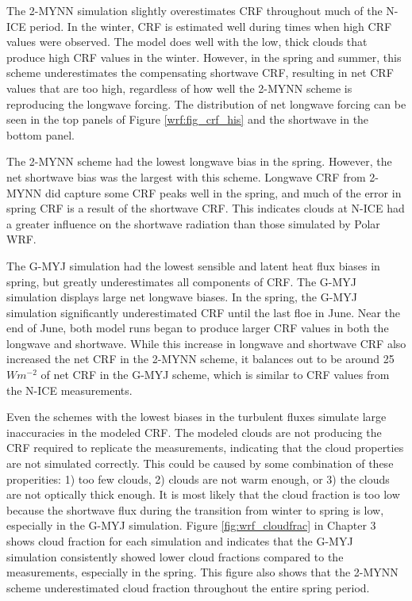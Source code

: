 The 2-MYNN simulation slightly overestimates CRF throughout much of the N-ICE period. In the winter, CRF is estimated well during times when high CRF values were observed. The model does well with the low, thick clouds that produce high CRF values in the winter. However, in the spring and summer, this scheme underestimates the compensating shortwave CRF, resulting in net CRF values that are too high, regardless of how well the 2-MYNN scheme is reproducing the longwave forcing. The distribution of net longwave forcing can be seen in the top panels of Figure \ref{wrf:fig_crf_his} and the shortwave in the bottom panel.

The 2-MYNN scheme had the lowest longwave bias in the spring. However, the net shortwave bias was the largest with this scheme. Longwave CRF from 2-MYNN did capture some CRF peaks well in the spring, and much of the error in spring CRF is a result of the shortwave CRF. This indicates clouds at N-ICE had a greater influence on the shortwave radiation than those simulated by Polar WRF.

The G-MYJ simulation had the lowest sensible and latent heat flux biases in spring, but greatly underestimates all components of CRF. The G-MYJ simulation displays large net longwave biases. In the spring, the G-MYJ simulation significantly underestimated CRF until the last floe in June. Near the end of June, both model runs began to produce larger CRF values in both the longwave and shortwave. While this increase in longwave and shortwave CRF also increased the net CRF in the 2-MYNN scheme, it balances out to be around 25 $Wm^{-2}$ of net CRF in the G-MYJ scheme, which is similar to CRF values from the N-ICE measurements.

Even the schemes with the lowest biases in the turbulent fluxes simulate large inaccuracies in the modeled CRF. The modeled clouds are not producing the CRF required to replicate the measurements, indicating that the cloud properties are not simulated correctly. This could be caused by some combination of these properities: 1) too few clouds, 2) clouds are not warm enough, or 3) the clouds are not optically thick enough. It is most likely that the cloud fraction is too low because the shortwave flux during the transition from winter to spring is low, especially in the G-MYJ simulation. Figure \ref{fig:wrf_cloudfrac} in Chapter 3 shows cloud fraction for each simulation and indicates that the G-MYJ simulation consistently showed lower cloud fractions compared to the measurements, especially in the spring. This figure also shows that the 2-MYNN scheme underestimated cloud fraction throughout the entire spring period.

